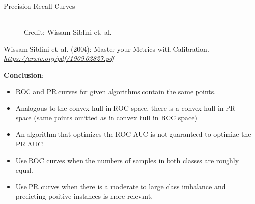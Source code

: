 \begin{vbframe}{Precision-Recall Curves}
\begin{figure}
    \centering
    \tiny{\\ Credit: Wissam Siblini et. al. \\}
\end{figure}
\vspace{-0.25cm}
{\tiny{Wissam Siblini et. al. (2004): Master your Metrics with Calibration. \emph{\url{https://arxiv.org/pdf/1909.02827.pdf}}}\par}




\framebreak

\textbf{Conclusion}: \\
\begin{itemize}
  \item ROC and PR curves for given algorithms contain the same points.
  \item Analogous to the convex hull in ROC space, there is a convex hull in PR space (same points omitted as in convex hull in ROC space).
  \item An algorithm that optimizes the ROC-AUC is not guaranteed to optimize
  the PR-AUC.
  \item Use ROC curves when the numbers of samples in both classes are roughly equal.
  \item Use PR curves when there is a moderate to large class
  imbalance and predicting positive instances is more relevant.
\end{itemize}
\end{vbframe}


\endlecture

